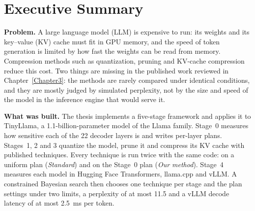 \documentclass[
11pt, %
english, %
singlespacing, %
headsepline, %
]{MastersDoctoralThesis} %
\begin{document}
\cleardoublepage

\chapter*{Executive Summary}

\noindent\textbf{Problem.} A large language model (LLM) is expensive to run: its weights and its key--value (KV) cache must fit in GPU memory, and the speed of token generation is limited by how fast the weights can be read from memory. Compression methods such as quantization, pruning and KV-cache compression reduce this cost. Two things are missing in the published work reviewed in Chapter~\ref{Chapter3}: the methods are rarely compared under identical conditions, and they are mostly judged by simulated perplexity, not by the size and speed of the model in the inference engine that would serve it.

\medskip\noindent\textbf{What was built.} The thesis implements a five-stage framework and applies it to TinyLlama, a 1.1-billion-parameter model of the Llama family. Stage~0 measures how sensitive each of the 22 decoder layers is and writes per-layer plans. Stages~1, 2 and 3 quantize the model, prune it and compress its KV cache with published techniques. Every technique is run twice with the same code: on a uniform plan (\emph{Standard}) and on the Stage~0 plan (\emph{Our method}). Stage~4 measures each model in Hugging Face Transformers, llama.cpp and vLLM. A constrained Bayesian search then chooses one technique per stage and the plan settings under two limits, a perplexity of at most 11.5 and a vLLM decode latency of at most 2.5~ms per token.
\end{document}
